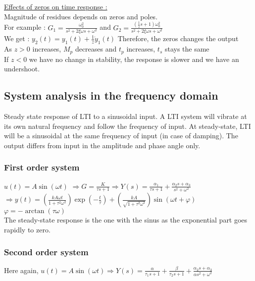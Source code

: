 \documentclass[../main.tex]{subfiles}
\begin{document}
\quad \underline{Effects of zeros on time response :}\\
Magnitude of residues depends on zeros and poles. \\
For example : $G_1 = \frac{\omega_0^2}{s^2+2\xi\omega s+\omega^2}$ and $G_2 = \frac{(\frac{1}{z}s+1)\omega_0^2}{s^2+2\xi\omega s+\omega^2}$\\
We get : $y_2(t) = y_1(t) + \frac{1}{z} \dot{y}_1(t)$ Therefore, the zeros changes the output\\

As $z>0$ increases, $M_p$ decreases and $t_p$ increases, $t_s$ stays the same\\
If $z<0$ we have no change in stability, the response is slower and we have an undershoot.\\

\subsection{System analysis in the frequency domain}
Steady state response of LTI to a sinusoidal input. A LTI system will vibrate at its own natural frequency and follow the frequency of input. At steady-state, LTI will be a sinusoidal at the same frequency of input (in case of damping). The output differs from input in the amplitude and phase angle only.\\

\subsubsection{First order system}
$u(t) = A\sin(\omega t)$ $\Rightarrow G = \frac{K}{\tau s +1} \Rightarrow Y(s) = \frac{\alpha_1}{\tau s+1} + \frac{\alpha_2 s+ \alpha_3}{s^2 + \omega^2}$\\
$\Rightarrow y(t) = (\frac{kA \omega t}{1+\tau^2 \omega^2}) \exp(-\frac{t}{\tau}) + (\frac{kA}{\sqrt{1+\tau^2 \omega^2}}) \sin(\omega t+ \varphi)$\\
$\varphi = -\arctan(\tau \omega)$\\

The steady-state response is the one with the sinus as the exponential part goes rapidly to zero.\\

\subsubsection{Second order system}
Here again, $u(t) = A\sin(\omega t) \Rightarrow Y(s) = \frac{\alpha}{\tau_1 s +1} + \frac{\beta}{\tau_2 s+ 1}+  \frac{\alpha_2 s + \alpha_3}{\alpha s^2 + \omega^2}$\\
\end{document}
